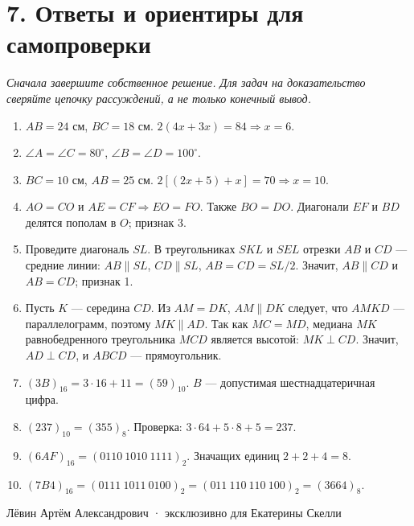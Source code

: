 \documentclass[a4paper,12pt]{article}
\newcommand{\sys}[2]{\left(#1\right)_{#2}}
\begin{document}
\section*{7. Ответы и ориентиры для самопроверки}
\textit{Сначала завершите собственное решение. Для задач на доказательство сверяйте цепочку рассуждений, а не только конечный вывод.}
\begin{enumerate}[label=\textbf{\arabic*.},itemsep=8pt]
\item \(AB=24\) см, \(BC=18\) см. \(2(4x+3x)=84\Rightarrow x=6\).
\item \(\angle A=\angle C=80^\circ\), \(\angle B=\angle D=100^\circ\).
\item \(BC=10\) см, \(AB=25\) см. \(2[(2x+5)+x]=70\Rightarrow x=10\).
\item \(AO=CO\) и \(AE=CF\Rightarrow EO=FO\). Также \(BO=DO\). Диагонали \(EF\) и \(BD\) делятся пополам в \(O\); признак 3.
\item Проведите диагональ \(SL\). В треугольниках \(SKL\) и \(SEL\) отрезки \(AB\) и \(CD\) --- средние линии: \(AB\parallel SL\), \(CD\parallel SL\), \(AB=CD=SL/2\). Значит, \(AB\parallel CD\) и \(AB=CD\); признак 1.
\item Пусть \(K\) --- середина \(CD\). Из \(AM=DK\), \(AM\parallel DK\) следует, что \(AMKD\) --- параллелограмм, поэтому \(MK\parallel AD\). Так как \(MC=MD\), медиана \(MK\) равнобедренного треугольника \(MCD\) является высотой: \(MK\perp CD\). Значит, \(AD\perp CD\), и \(ABCD\) --- прямоугольник.
\item \(\sys{3B}{16}=3\cdot16+11=\sys{59}{10}\). \(B\) --- допустимая шестнадцатеричная цифра.
\item \(\sys{237}{10}=\sys{355}{8}\). Проверка: \(3\cdot64+5\cdot8+5=237\).
\item \(\sys{6AF}{16}=\sys{0110\ 1010\ 1111}{2}\). Значащих единиц \(2+2+4=8\).
\item \(\sys{7B4}{16}=\sys{0111\ 1011\ 0100}{2}=\sys{011\ 110\ 110\ 100}{2}=\sys{3664}{8}\).
\end{enumerate}
\vfill
\begin{center}\color{darkaccent}\footnotesize Лёвин Артём Александрович · эксклюзивно для Екатерины Скелли\end{center}
\end{document}
